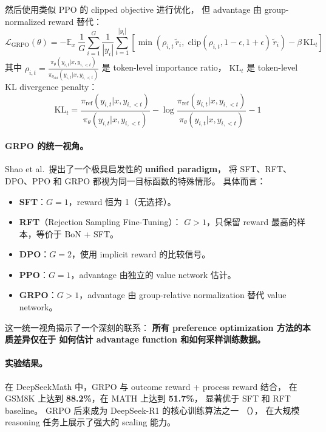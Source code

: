 然后使用类似 PPO 的 clipped objective 进行优化，
但 advantage 由 group-normalized reward 替代：
\begin{equation}
\label{eq:pref:grpo-obj}
\mathcal{L}_{\text{GRPO}}(\theta) = -\mathbb{E}_{x}\; \frac{1}{G} \sum_{i=1}^{G} \frac{1}{|y_i|} \sum_{t=1}^{|y_i|}
\left[
  \min\!\left(
    \rho_{i,t}\, \tilde{r}_i,\;
    \text{clip}(\rho_{i,t}, 1{-}\epsilon, 1{+}\epsilon)\, \tilde{r}_i
  \right)
  - \beta\, \text{KL}_t
\right]
\end{equation}
其中 $\rho_{i,t} = \frac{\pi_\theta(y_{i,t} | x, y_{i,<t})}{\pi_{\theta_{\text{old}}}(y_{i,t} | x, y_{i,<t})}$
是 token-level importance ratio，
$\text{KL}_t$ 是 token-level KL divergence penalty：
\begin{equation}
\text{KL}_t = \frac{\pi_{\text{ref}}(y_{i,t} | x, y_{i,<t})}{\pi_\theta(y_{i,t} | x, y_{i,<t})} - \log \frac{\pi_{\text{ref}}(y_{i,t} | x, y_{i,<t})}{\pi_\theta(y_{i,t} | x, y_{i,<t})} - 1
\end{equation}

\paragraph{GRPO 的统一视角。}
Shao et al.\ 提出了一个极具启发性的 \textbf{unified paradigm}，
将 SFT、RFT、DPO、PPO 和 GRPO 都视为同一目标函数的特殊情形。
具体而言：
\begin{itemize}[leftmargin=2em]
  \item \textbf{SFT}：$G=1$，reward 恒为 1（无选择）。
  \item \textbf{RFT}（Rejection Sampling Fine-Tuning）：
    $G>1$，只保留 reward 最高的样本，等价于 BoN + SFT。
  \item \textbf{DPO}：$G=2$，使用 implicit reward 的比较信号。
  \item \textbf{PPO}：$G=1$，advantage 由独立的 value network 估计。
  \item \textbf{GRPO}：$G>1$，advantage 由 group-relative normalization 替代 value network。
\end{itemize}

\noindent
这一统一视角揭示了一个深刻的联系：
\textbf{所有 preference optimization 方法的本质差异仅在于
如何估计 advantage function 和如何采样训练数据。}

\paragraph{实验结果。}
在 DeepSeekMath 中，GRPO 与 outcome reward + process reward 结合，
在 GSM8K 上达到 \textbf{88.2\%}，在 MATH 上达到 \textbf{51.7\%}，
显著优于 SFT 和 RFT baseline。
GRPO 后来成为 DeepSeek-R1 \cite{deepseek2025r1} 的核心训练算法之一
（），
在大规模 reasoning 任务上展示了强大的 scaling 能力。

